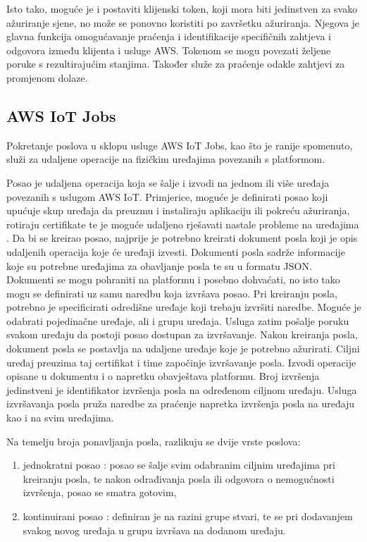 Isto tako, moguće je i postaviti klijenski token, koji mora biti jedinstven za svako ažuriranje sjene, no može se ponovno koristiti po završetku ažuriranja. Njegova je glavna funkcija omogućavanje praćenja i identifikacije specifičnih zahtjeva i odgovora između klijenta i usluge AWS. Tokenom se mogu povezati željene poruke s rezultirajućim stanjima. Također služe za praćenje odakle zahtjevi za promjenom dolaze.  

\subsection{AWS IoT Jobs}

Pokretanje poslova u sklopu usluge AWS IoT Jobs, kao što je ranije spomenuto, služi za udaljene operacije na fizičkim uređajima povezanih s platformom. 

Posao je udaljena operacija koja se šalje i izvodi na jednom ili više uređaja povezanih s uslugom AWS IoT. Primjerice, moguće je definirati posao koji upućuje skup uređaja da preuzmu i instaliraju aplikaciju ili pokreću ažuriranja, rotiraju certifikate te je moguće udaljeno rješavati nastale probleme na uređajima . Da bi se kreirao posao, najprije je potrebno kreirati dokument posla  koji je opis udaljenih operacija koje će uređaji izvesti. Dokumenti posla sadrže informacije koje su potrebne uređajima za obavljanje posla te su u formatu JSON. Dokumenti se mogu pohraniti na platformu i posebno dohvaćati, no isto tako mogu se definirati uz samu naredbu koja izvršava posao. Pri kreiranju posla, potrebno je specificirati odredišne uređaje  koji trebaju izvršiti naredbe. Moguće je odabrati pojedinačne uređaje, ali i grupu uređaja. Usluga zatim pošalje poruku svakom uređaju da postoji posao dostupan za izvršavanje. Nakon kreiranja posla, dokument posla se postavlja na udaljene uređaje koje je potrebno ažurirati. Ciljni uređaj preuzima taj certifikat i time započinje izvršavanje posla. Izvodi operacije opisane u dokumentu i o napretku obavještava platformu. Broj izvršenja  jedinstveni je identifikator izvršenja posla na određenom ciljnom uređaju. Usluga izvršavanja posla pruža naredbe za praćenje napretka izvršenja posla na uređaju kao i na svim uređajima. 

Na temelju broja ponavljanja posla, razlikuju se dvije vrste poslova:
\begin{enumerate}
	\item jednokratni posao : posao se šalje svim odabranim ciljnim uređajima pri kreiranju posla, te nakon odrađivanja posla ili odgovora o nemogućnosti izvršenja, posao se smatra gotovim, 
	\item kontinuirani posao : definiran je na razini grupe stvari, te se pri dodavanjem svakog novog uređaja u grupu izvršava na dodanom uređaju. 
\end{enumerate}

